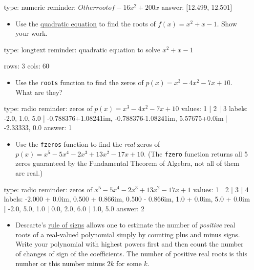 \documentclass[12pt]{article}
\begin{document}
\begin{answer}
    type: numeric
    reminder: \(Other root of -16x^2 + 200x\)
    answer: [12.499, 12.501]

\end{answer}

\begin{itemize}
\itemsep1pt\parskip0pt
\item
  Use the
  \href{http://en.wikipedia.org/wiki/Quadratic_equation}{quadratic
  equation} to find the roots of $f(x) = x^2 + x - 1$. Show your work.
\end{itemize}

\begin{answer}
type: longtext
reminder: quadratic equation to solve \(x^2 + x - 1\)

rows: 3
cols: 60
\end{answer}

\begin{itemize}
\itemsep1pt\parskip0pt
\item
  Use the \texttt{roots} function to find the zeros of
  $p(x)=x^3 -4x^2 -7x + 10$. What are they?
\end{itemize}

\begin{answer}
type: radio
reminder: zeros of \(p(x)=x^3 -4x^2 -7x + 10\)
values: 1 | 2 | 3
labels: -2.0, 1.0, 5.0 | -0.788376+1.08241im,  -0.788376-1.08241im, 5.57675+0.0im | -2.33333, 0.0
answer: 1
\end{answer}

\begin{itemize}
\itemsep1pt\parskip0pt
\item
  Use the \texttt{fzeros} function to find the \emph{real} zeros of
  $p(x) = x^5 -5x^4 -2x^3 + 13x^2 -17x + 10$. (The \texttt{fzero}
  function returns all 5 zeros guaranteed by the Fundamental Theorem of
  Algebra, not all of them are real.)
\end{itemize}

\begin{answer}
type: radio
reminder: zeros of \( x^5-5x^4 -2x^3 + 13x^2 -17x + 1\)
values: 1 | 2 | 3 | 4
labels: -2.000 + 0.0im, 0.500 + 0.866im, 0.500 - 0.866im, 1.0 + 0.0im, 5.0 + 0.0im | -2.0, 5.0, 1.0 | 0.0, 2.0, 6.0 | 1.0, 5.0
answer: 2
\end{answer}

\begin{itemize}
\itemsep1pt\parskip0pt
\item
  Descarte's
  \href{http://en.wikipedia.org/wiki/Descartes_rule_of_signs}{rule of
  signs} allows one to estimate the number of \emph{positive} real roots
  of a real-valued polynomial simply by counting plus and minus signs.
  Write your polynomial with highest powers first and then count the
  number of changes of sign of the coefficients. The number of positive
  real roots is this number or this number minus $2k$ for some $k$.
\end{itemize}
\end{document}
